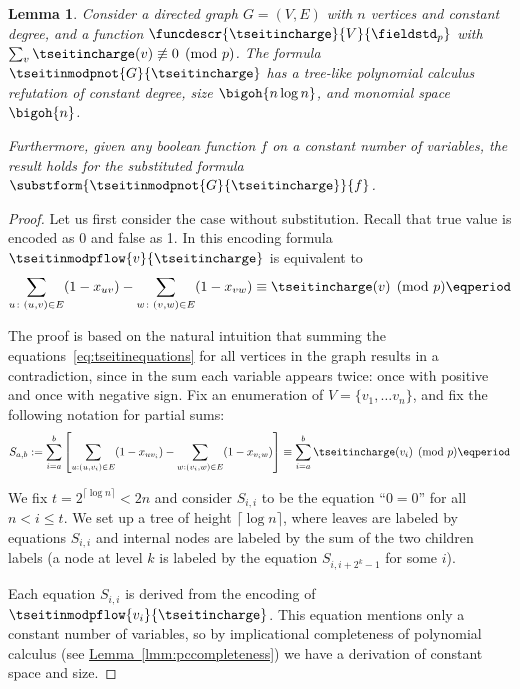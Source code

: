 \documentclass[11pt]{article}
\numberwithin{equation}{section}
\newtheorem{lemma}[theorem]{Lemma}
\theoremstyle{definition}
\theoremstyle{plain}
\newcommand{\expref}[2]{\hyperref[#2]{#1~\ref{#2}}}
\begin{document}
\begin{lemma}\label{lmm:tseitinupperbound}
  Consider a directed graph $G=(V,E)$ with $n$ vertices and constant
  degree, and a function
  \mbox{$\funcdescr{\tseitincharge}{V}{\fieldstd_p}$}
  with
  $\sum_{v}\tseitincharge(v)\not\equiv 0 \pmod{p}$. The formula
  $\tseitinmodpnot{G}{\tseitincharge}$ has a tree-like polynomial calculus
  refutation of constant degree, size $\bigoh{n\log n}$, and monomial
  space $\bigoh{n}$.

  Furthermore, given any boolean function $f$ on a constant number of
  variables, the result holds for the substituted formula
  $\substform{\tseitinmodpnot{G}{\tseitincharge}}{f}$.
\end{lemma}

\begin{proof}
Let us first consider the case without substitution. Recall that true value is encoded as $0$ and false as 1. In this encoding formula $\tseitinmodpflow{v}{\tseitincharge}$ is equivalent to
  \begin{equation}\label{eq:tseitinequations}
    \sum_{u\colon(u,v)\in E} (1-x_{uv}) - \sum_{w\colon(v,w)\in E} (1-x_{vw})
    \equiv \tseitincharge(v) \pmod{p} \eqperiod
  \end{equation}

  The proof is based on the natural intuition that summing the
  equations~\eqref{eq:tseitinequations} for all vertices in the graph
  results in a contradiction, since in the sum each variable appears
  twice: once with positive and once with negative sign.
  Fix an enumeration of $V=\{v_{1},\ldots
  v_{n}\}$, and fix the following notation for partial sums:
  \begin{equation}
    S_{a,b}:=
    \sum^{b}_{i=a}
    \left[\sum_{u:(u,v_{i})\in E} (1-x_{uv_{i}})
    -
    \sum_{w:(v_{i},w)\in E} (1-x_{v_{i}w})\right]
    \equiv
    \sum^{b}_{i=a} \tseitincharge(v_{i}) \pmod{p} \eqperiod
  \end{equation}
  
  
  We fix $t=2^{\lceil \log n \rceil} < 2n$ and consider $S_{i,i}$ to
  be the equation ``$0=0$'' for all $n < i \leq t$.
  We set up a tree of height $\lceil \log n \rceil$, where leaves are
  labeled by equations $S_{i,i}$ and internal nodes are labeled by the
  sum of the two children labels (\ieComma a node at level $k$ is labeled
  by the equation $S_{i,i+2^{k}-1}$ for some $i$).

  Each equation $S_{i,i}$ is derived from the encoding of
  $\tseitinmodpflow{v_{i}}{\tseitincharge}$. This equation mentions only a constant
  number of variables, so by implicational completeness of polynomial
  calculus (see \expref{Lemma}{lmm:pccompleteness}) we have a derivation
  of constant space and size.


\end{proof}
\end{document}
